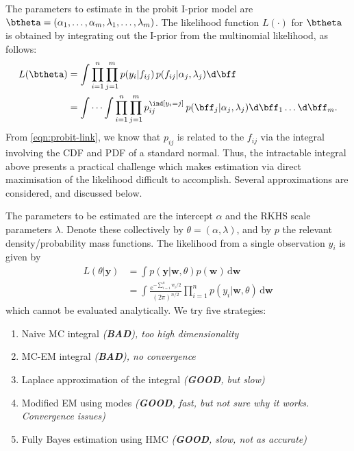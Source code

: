 The parameters to estimate in the probit I-prior model are $\btheta = (\alpha_1, \dots, \alpha_m, \lambda_1, \dots, \lambda_m)$. The likelihood function $L(\cdot)$ for $\btheta$ is obtained by integrating out the I-prior from the multinomial likelihood, as follows:
\begin{align*}
  L(\btheta) 
  &= \int \prod_{i=1}^n \prod_{j=1}^m p(y_i | f_{ij} ) \, p(f_{ij}|\alpha_j, \lambda_j) \d \bff \\
  &= \idotsint \prod_{i=1}^n \prod_{j=1}^m p_{ij}^{\ind[y_i = j]} \, p(\bff_j | \alpha_j, \lambda_j) \d \bff_1 \dots \d \bff_m .
\end{align*}
From \eqref{eqn:probit-link}, we know that $p_{ij}$ is related to the $f_{ij}$ via the integral involving the CDF and PDF of a standard normal. Thus, the intractable integral above presents a practical challenge which makes estimation via direct maximisation of the likelihood difficult to accomplish. Several approximations are considered, and discussed below.

The parameters to be estimated are the intercept $\alpha$ and the RKHS scale parameters $\lambda$. Denote these collectively by $\theta = (\alpha, \lambda)$, and by $p$ the relevant density/probability mass functions. The likelihood from a single observation $y_i$ is given by
\begin{align*}
L(\theta | \mathbf y) 
&= \int p(\mathbf y | \mathbf w, \theta) p(\mathbf w) \, \text{d}\mathbf w \\
&= \int \frac{e^{-\sum_{i=1}^n w_i/2}}{(2\pi)^{n/2}} \prod_{i=1}^n p(y_i | \mathbf w, \theta) \, \text{d}\mathbf w 
\end{align*}
which cannot be evaluated analytically. We try five strategies:
\begin{enumerate}
  \item Naive MC integral \emph{(\textbf{BAD}), too high dimensionality}
  \item MC-EM integral \emph{(\textbf{BAD}), no convergence}
  \item Laplace approximation of the integral \emph{(\textbf{GOOD}, but slow)}
  \item Modified EM using modes \emph{(\textbf{GOOD}, fast, but not sure why it works. Convergence issues)}
  \item Fully Bayes estimation using HMC \emph{(\textbf{GOOD}, slow, not as accurate)}
\end{enumerate}


